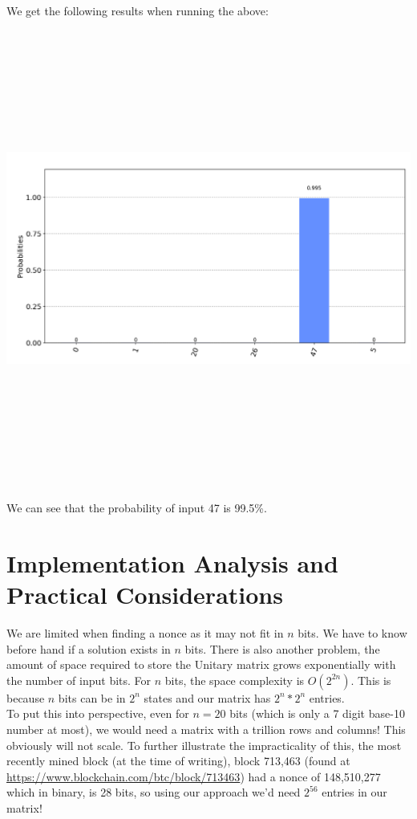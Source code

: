 \documentclass[11pt]{article} %
\begin{document}
\noindent We get the following results when running the above:

\includegraphics[keepaspectratio, width=15cm, height=15cm]{plot}

We can see that the probability of input 47 is 99.5\%.

\section{Implementation Analysis and Practical Considerations}{}
We are limited when finding a nonce as it may not fit in $n$ bits. We have to know before hand if a solution exists in $n$ bits. There is also another problem, the amount of space required to store the Unitary matrix grows exponentially with the number of input bits. For $n$ bits, the space complexity is $O(2^{2n})$. This is because $n$ bits can be in $2^{n}$ states and our matrix has $2^n * 2^n$ entries. \\

\noindent To put this into perspective, even for $n = 20$ bits (which is only a 7 digit base-10 number at most), we would need a matrix with a trillion rows and columns! This obviously will not scale. To further illustrate the impracticality of this, the most recently mined block (at the time of writing), block 713,463 (found at \url{https://www.blockchain.com/btc/block/713463}) had a nonce of 148,510,277 which in binary, is 28 bits, so using our approach we'd need $2^{56}$ entries in our matrix!\\
\end{document}
